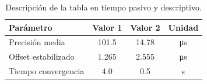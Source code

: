 
\begin{table}[htbp]
  \centering
  \caption{Descripción de la tabla en tiempo pasivo y descriptivo.}
  \label{tab:etiqueta}
  \begin{tabular}{@{}lS[table-format=3.2]S[table-format=2.2]c@{}}
    \toprule
    {Parámetro} & {Valor 1} & {Valor 2} & {Unidad} \\
    \midrule
    Precisión media & 101.5 & 14.78 & \si{\micro\second} \\
    Offset estabilizado & 1.265 & 2.555 & \si{\micro\second} \\
    Tiempo convergencia & 4.0 & 0.5 & \si{\second} \\
    \bottomrule
  \end{tabular}
\end{table}

